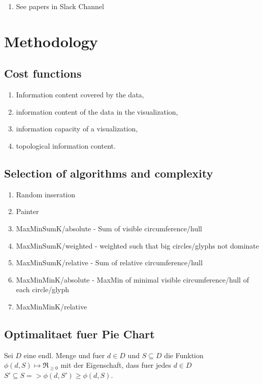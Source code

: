 \documentclass[a4paper,11pt]{article}
\begin{document}
\begin{enumerate}
  \item See papers in Slack Channel
\end{enumerate}

\newpage
\section{Methodology}

\subsection{Cost functions}

\begin{enumerate}
  \item Information content covered by the data,
  \item information content of the data in the visualization,
  \item information capacity of a visualization,
  \item topological information content.
\end{enumerate}



\subsection{Selection of algorithms and complexity}

\begin{enumerate}
  \item Random inseration
  \item Painter
  \item MaxMinSumK/absolute - Sum of visible circumference/hull
  \item MaxMinSumK/weighted - weighted such that big circles/glyphs not dominate
  \item MaxMinSumK/relative - Sum of relative circumference/hull
  \item MaxMinMinK/absolute - MaxMin of minimal visible circumference/hull of each circle/glyph
  \item MaxMinMinK/relative
\end{enumerate}

\subsection{Optimalitaet fuer Pie Chart}

Sei $ D $ eine endl. Menge und fuer $ d \in D $ und $ S \subseteq D$ die Funktion $ \phi(d, S) \mapsto \Re_{\geq 0}$ mit der Eigenschaft, dass fuer jedes $d \in D$ $S' \subseteq S => \phi(d, S') \geq \phi(d, S)$.
\end{document}

